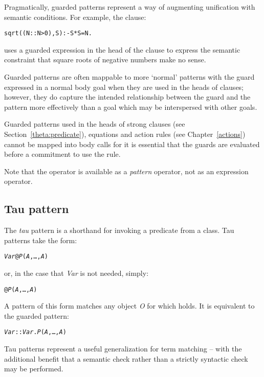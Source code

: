 Pragmatically, guarded patterns represent a way of augmenting unification with semantic conditions. For example, the clause:
\begin{alltt}
sqrt((N::N>0),S) :- S*S=N.
\end{alltt}
uses a guarded expression in the head of the clause to express the semantic constraint that square roots of negative numbers make no sense.

Guarded patterns are often mappable to more `normal' patterns with the guard expressed in a normal body goal when they are used in the heads of clauses; however, they do capture the intended relationship between the guard and the pattern more effectively than a goal which may be interspersed with other goals. 

Guarded patterns used in the heads of strong clauses (see Section~\vref{theta:predicate}), equations and action rules (see Chapter~\vref{actions}) cannot be mapped into body calls for it is essential that the guards are evaluated before a commitment to use the rule. 

\begin{aside}
Note that the \q{::} operator is available as a \emph{pattern} operator, not as an expression operator.
\end{aside}

\subsection{Tau pattern}
\label{expression:tau}

The \emph{tau} pattern is a shorthand for invoking a predicate from a class. Tau patterns take the form:
\begin{alltt}
\emph{Var}@\emph{P}(\emph{A},\ldots,\emph{A\subn})
\end{alltt}
or, in the case that \emph{Var} is not needed, simply:
\begin{alltt}
@\emph{P}(\emph{A},\ldots,\emph{A\subn})
\end{alltt}
A pattern of this form matches any object \emph{O} for which  holds. It is equivalent to the guarded pattern:
\begin{alltt}
\emph{Var}::\emph{Var}.\emph{P}(\emph{A},\ldots,\emph{A\subn})
\end{alltt}

Tau patterns represent a useful generalization for term matching -- with the additional benefit that a semantic check rather than a strictly syntactic check may be performed. 


